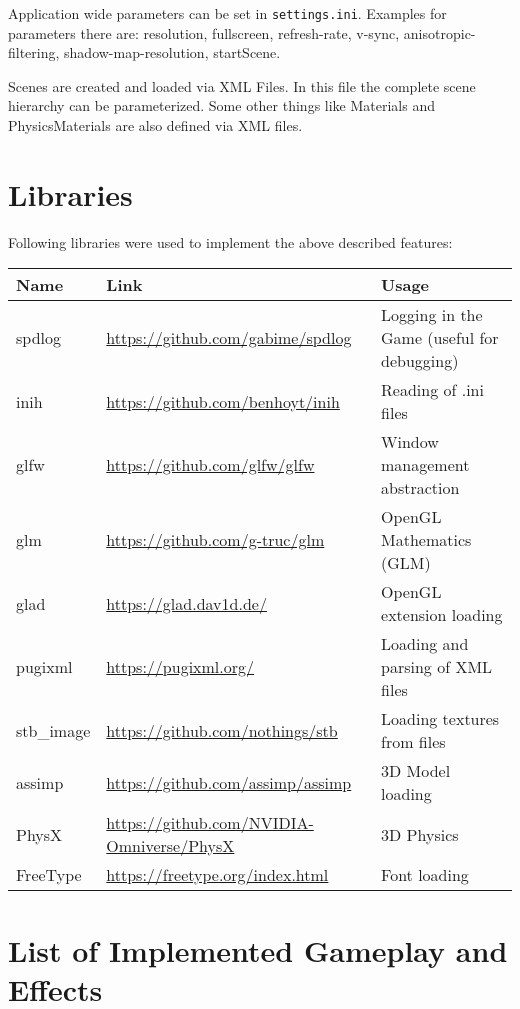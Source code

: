 \documentclass{article}
\begin{document}
    Application wide parameters can be set in \verb|settings.ini|. Examples for parameters there are: resolution, fullscreen, refresh-rate, v-sync, anisotropic-filtering, shadow-map-resolution, startScene.

    Scenes are created and loaded via XML Files. In this file the complete scene hierarchy can be parameterized. Some other things like Materials and PhysicsMaterials are also defined via XML files.

    \section{Libraries}

    Following libraries were used to implement the above described features:

    \begin{tabular}{|l|l|l|}
        \hline
        Name & Link & Usage \\ \hline
        spdlog & \url{https://github.com/gabime/spdlog} & Logging in the Game (useful for debugging) \\ \hline
        inih & \url{https://github.com/benhoyt/inih} & Reading of .ini files \\ \hline
        glfw & \url{https://github.com/glfw/glfw} & Window management abstraction \\ \hline
        glm & \url{https://github.com/g-truc/glm} & OpenGL Mathematics (GLM) \\ \hline
        glad & \url{https://glad.dav1d.de/} & OpenGL extension loading \\ \hline
        pugixml & \url{https://pugixml.org/} & Loading and parsing of XML files \\ \hline
        stb\_image & \url{https://github.com/nothings/stb} & Loading textures from files \\ \hline
        assimp & \url{https://github.com/assimp/assimp} & 3D Model loading \\ \hline
        PhysX & \url{https://github.com/NVIDIA-Omniverse/PhysX} & 3D Physics \\ \hline
        FreeType & \url{https://freetype.org/index.html} & Font loading \\ \hline
    \end{tabular}

    \section{List of Implemented Gameplay and Effects}
\end{document}
